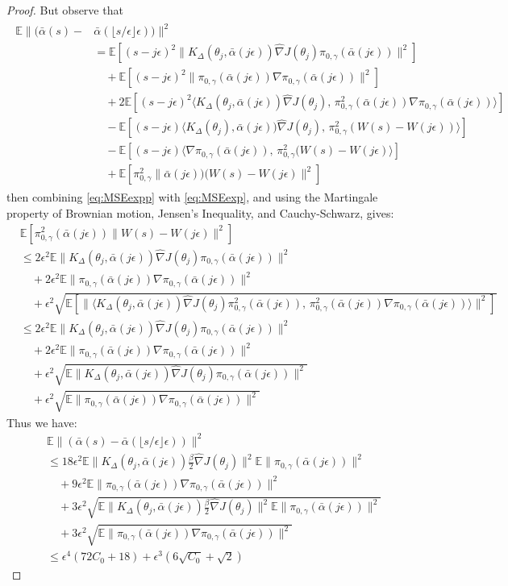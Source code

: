 \documentclass[journal,onecolumn]{IEEEtran}
\newcommand{\step}{\epsilon}
\newcommand{\grad}{\nabla}
\newcommand{\gradn}{\hat{\nabla}}
\newcommand{\rew}{J}
\newcommand{\CE}{\mathbb{E}}
\newcommand{\tjm}{\theta_j}
\newcommand{\ajm}{\bar{\alpha}(j\step)}
\newcommand{\alsbar}{\bar{\alpha}(s)}
\newcommand{\K}{K}
\newcommand{\Kd}{\K_{\Delta}}
\newcommand{\alsebar}{\bar{\alpha}(\lfloor s / \step \rfloor \step)}
\newcommand{\ids}{\pi}
\newcommand{\idw}{\gamma}
\newcommand{\isp}{0,\idw}
\newcommand{\idistrw}{\ids_{\isp}}
\begin{document}
{\begin{proof}
{But observe that
\begin{align}
\begin{split}
\label{eq:MSEexpp}
    \CE\|(\alsbar -& \alsebar)\|^2 \\&= \CE\left[(s-j\step)^2\|\Kd(\tjm,\ajm)\gradn\rew(\tjm)\idistrw(\ajm)\|^2\right]\\
    &\quad + \CE\left[ (s-j\step)^2\|\idistrw(\ajm)\grad\idistrw(\ajm)\|^2\right] \\
    &\quad + 2\CE\left[(s-j\step)^2\langle \Kd(\tjm,\ajm)\gradn\rew(\tjm),\,\idistrw^2(\ajm)\grad\idistrw(\ajm)\rangle\right] \\
    &\quad - \CE\left[ (s-j\step)\langle\Kd(\tjm),\ajm)\gradn\rew(\tjm),\,\idistrw^2(W(s)-W(j\step))\rangle\right]\\
    &\quad - \CE\left[(s-j\step)\langle\grad\idistrw(\ajm),\,\idistrw^2(W(s)-W(j\step)\rangle \right] \\
    &\quad + \CE\left[\idistrw^2\|\ajm)(W(s)-W(j\step)\|^2\right]
\end{split}
\end{align}
then combining \eqref{eq:MSEexpp} with \eqref{eq:MSEexp}, and using the Martingale property of Brownian motion, Jensen's Inequality, and Cauchy-Schwarz, gives:
\begin{align*}
    &\CE\left[\idistrw^2(\ajm)\|W(s)-W(j\step)\|^2\right] \\&\leq 2\step^2\CE\|\Kd(\tjm,\ajm)\gradn\rew(\tjm)\idistrw(\ajm)\|^2 \\
    &\quad + 2\step^2\CE\|\idistrw(\ajm)\grad\idistrw(\ajm)\|^2 \\&\quad + \step^2\sqrt{\CE\left[\|\langle\Kd(\tjm,\ajm)\gradn\rew(\tjm)\idistrw^2(\ajm),\, \idistrw^2(\ajm)\grad\idistrw(\ajm) \rangle\|^2\right]} \\
    &\leq 2\step^2\CE\|\Kd(\tjm,\ajm)\gradn\rew(\tjm)\idistrw(\ajm)\|^2 \\
    &\quad + 2\step^2\CE\|\idistrw(\ajm)\grad\idistrw(\ajm)\|^2 \\&\quad +\step^2\sqrt{\CE\|\Kd(\tjm,\ajm)\gradn\rew(\tjm)\idistrw(\ajm)\|^2} \\&\quad + \step^2\sqrt{\CE\|\idistrw(\ajm)\grad\idistrw(\ajm)\|^2} 
\end{align*}
Thus we have:
\begin{align*}
    &\CE\|(\alsbar - \alsebar) \|^2 \\
    &\leq 18\step^2\CE\|\Kd(\tjm,\ajm)\frac{\beta}{2}\gradn\rew(\tjm)\|^2\CE\|\idistrw(\bar{\alpha}(j\step))\|^2 \\
    &\quad + 9\step^2\CE\|\idistrw(\ajm)\grad\idistrw(\ajm) \|^2 \\
    &\quad + 3\step^2\sqrt{\CE\|\Kd(\tjm,\ajm)\frac{\beta}{2}\gradn\rew(\tjm)\|^2\CE\|\idistrw(\bar{\alpha}(j\step))\|^2} \\
    &\quad  + 3\step^2\sqrt{\CE\|\idistrw(\ajm)\grad\idistrw(\ajm) \|^2} \\
    &\leq \step^4\left(72C_0+ 18\right) + \step^3\left(6\sqrt{C_0} +\sqrt{2}\right)
\end{align*}

}
\end{proof}}
\end{document}
